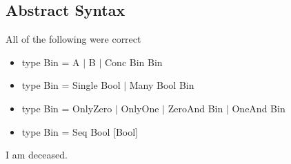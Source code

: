 \documentclass{article}
\theoremstyle{definition}
\begin{document}
\subsection{Abstract Syntax}
All of the following were correct
\begin{itemize}
    \item type Bin = A $|$ B $|$ Conc Bin Bin
    \item type Bin = Single Bool $|$ Many Bool Bin
    \item type Bin = OnlyZero $|$ OnlyOne $|$ ZeroAnd Bin $|$ OneAnd Bin
    \item type Bin = Seq Bool [Bool]
\end{itemize}
I am deceased.
\end{document}
